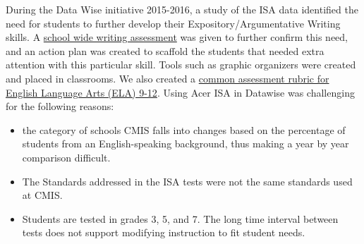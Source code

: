 During the Data Wise initiative 2015-2016, a study of the ISA data identified the need for students to further develop their Expository/Argumentative Writing skills.  A \href{https://drive.google.com/drive/folders/0ByVFfrm0zfolLU9Vb0ZBeF9uZjQ}{school wide writing assessment} was given to further confirm this need, and an action plan was created to scaffold the students that needed extra attention with this particular skill. Tools such as graphic organizers were created and placed in classrooms.  We also created a \href{https://docs.google.com/document/d/1JvVcmrIylkSYJeT4vgbyrqQTfZuJW-Iu6GB6jNCreIU/edit?ts=58a5129f}{common assessment rubric for English Language Arts (ELA) 9-12}.  Using Acer ISA in Datawise was challenging for the following reasons: 
\begin{itemize}
\item the category of schools CMIS falls into changes based on the percentage of students from an English-speaking background, thus making a year by year comparison difficult.
\item The Standards addressed in the ISA tests were not the same standards used at CMIS.
\item Students are tested in grades 3, 5, and 7.  The long time interval between tests does not support modifying instruction to fit student needs.
\end{itemize}


